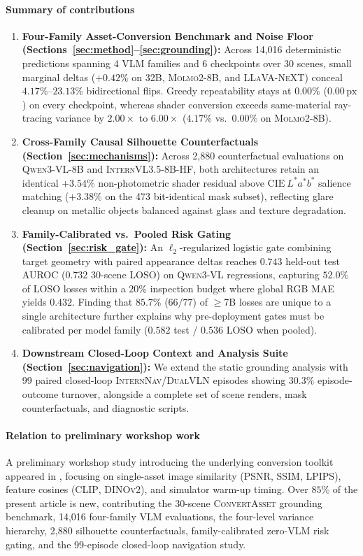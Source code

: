 \paragraph{Summary of contributions}
\begin{enumerate}
    \item \textbf{Four-Family Asset-Conversion Benchmark and Noise Floor (Sections~\ref{sec:method}--\ref{sec:grounding}):} Across 14,016 deterministic predictions spanning 4 \textsc{VLM} families and 6 checkpoints over 30 scenes, small marginal deltas ($+0.42\%$ on 32B, \textsc{Molmo2-8B}, and \textsc{LLaVA-NeXT}) conceal $4.17\%\text{--}23.13\%$ bidirectional flips. Greedy repeatability stays at $0.00\%$ ($0.00\,\mathrm{px}$) on every checkpoint, whereas shader conversion exceeds same-material ray-tracing variance by $2.00\times$ to $6.00\times$ ($4.17\%$ vs.\ $0.00\%$ on \textsc{Molmo2-8B}).
    \item \textbf{Cross-Family Causal Silhouette Counterfactuals (Section~\ref{sec:mechanisms}):} Across 2,880 counterfactual evaluations on \textsc{Qwen3-VL-8B} and \textsc{InternVL3.5-8B-HF}, both architectures retain an identical \textbf{$+3.54\%$} non-photometric shader residual above $\mathrm{CIE}~L^*a^*b^*$ salience matching ($+3.38\%$ on the 473 bit-identical mask subset), reflecting glare cleanup on metallic objects balanced against glass and texture degradation.
    \item \textbf{Family-Calibrated vs.\ Pooled Risk Gating (Section~\ref{sec:risk_gate}):} An $\ell_2$-regularized logistic gate combining target geometry with paired appearance deltas reaches $0.743$ held-out test \textsc{AUROC} ($0.732$ 30-scene \textsc{LOSO}) on \textsc{Qwen3-VL} regressions, capturing $52.0\%$ of \textsc{LOSO} losses within a $20\%$ inspection budget where global \textsc{RGB MAE} yields $0.432$. Finding that $85.7\%$ ($66/77$) of $\ge$7B losses are unique to a single architecture further explains why pre-deployment gates must be calibrated per model family ($0.582$ test / $0.536$ \textsc{LOSO} when pooled).
    \item \textbf{Downstream Closed-Loop Context and Analysis Suite (Section~\ref{sec:navigation}):} We extend the static grounding analysis with 99 paired closed-loop \textsc{InternNav/\allowbreak DualVLN} episodes showing $30.3\%$ episode-outcome turnover, alongside a complete set of scene renders, mask counterfactuals, and diagnostic scripts.
\end{enumerate}

\paragraph{Relation to preliminary workshop work}
A preliminary workshop study introducing the underlying conversion toolkit appeared in \citet{Zhu2026Evaluating}, focusing on single-asset image similarity (\textsc{PSNR}, \textsc{SSIM}, \textsc{LPIPS}), feature cosines (\textsc{CLIP}, \textsc{DINOv2}), and simulator warm-up timing. Over $85\%$ of the present article is new, contributing the 30-scene \textsc{ConvertAsset} grounding benchmark, 14,016 four-family \textsc{VLM} evaluations, the four-level variance hierarchy, 2,880 silhouette counterfactuals, family-calibrated zero-\textsc{VLM} risk gating, and the 99-episode closed-loop navigation study.
